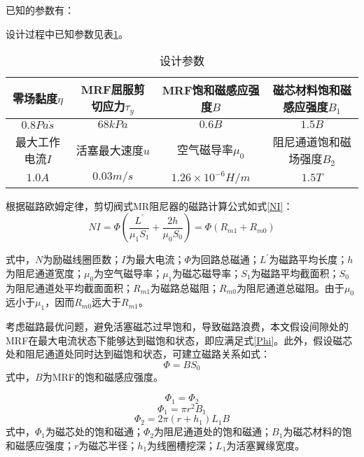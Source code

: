 已知的参数有：

设计过程中已知参数见表\ref{init}。
\begin{table}[H]
\caption{设计参数}
\centering
\label{init}
\begin{tiny}
\begin{tabular}{|c|c|c|c|}
\hline 零场黏度$\eta$ & MRF屈服剪切应力$\tau_y$ & MRF饱和磁感应强度$B$ & 磁芯材料饱和磁感应强度$B_1$ \\
\hline $0.8Pa\dot s$ & $68kPa$ & $0.6B$ & $1.5B$ \\
\hline 最大工作电流$I$ & 活塞最大速度$u$ & 空气磁导率$\mu_0$ & 阻尼通道饱和磁场强度$B_2$ \\
\hline $1.0A$ & $0.03m/s$ & $1.26\times10^{-6}H/m$ & $1.5T$ \\
\hline
\end{tabular}
\end{tiny}
\end{table}



根据磁路欧姆定律，剪切阀式MR阻尼器的磁路计算公式如式\eqref{NI}：
\begin{equation}
NI=\Phi\left(\frac{L^{'}}{\mu_1S_1}+\frac{2h}{\mu_0S_0}\right)=\Phi\left(R_{m1}+R_{m0}\right) \label{NI}
\end{equation}

式中，$N$为励磁线圈匝数；$I$为最大电流；$\Phi$为回路总磁通；$L^{'}$为磁路平均长度；$h$为阻尼通道宽度；$\mu_0$为空气磁导率；$\mu_1$为磁芯磁导率；$S_1$为磁路平均截面积；$S_0$为阻尼通道处平均截面面积；$R_{m1}$为磁路总磁阻；$R_{m0}$为阻尼通道总磁阻。由于$\mu_0$远小于$\mu_1$，因而$R_{m0}$远大于$R_{m1}$。

考虑磁路最优问题，避免活塞磁芯过早饱和，导致磁路浪费，本文假设间隙处的MRF在最大电流状态下能够达到磁饱和状态，即应满足式\eqref{Phi}。此外，假设磁芯处和阻尼通道处同时达到磁饱和状态，可建立磁路关系如式：
\begin{equation}
\Phi=BS_0\label{Phi}
\end{equation}
式中，$B$为MRF的饱和磁感应强度。

\begin{equation}
\Phi_1=\Phi_2\label{Phi1}
\end{equation}
\begin{equation}
\Phi_1=\pi r^2B_1\label{Phi2}
\end{equation}
\begin{equation}
\Phi_2=2\pi\left(r+h_1\right)L_1B\label{Phi3}
\end{equation}
式中，$\Phi_1$为磁芯处的饱和磁通；$\Phi_2$为阻尼通道处的饱和磁通；$B_1$为磁芯材料的饱和磁感应强度；$r$为磁芯半径；$h_1$为线圈槽挖深；$L_1$为活塞翼缘宽度。

